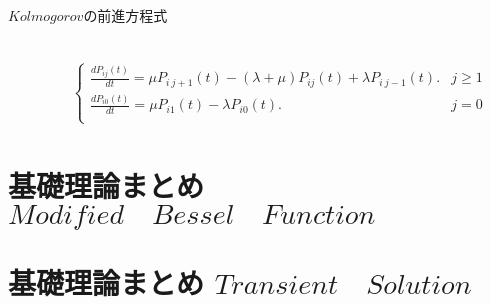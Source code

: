 \documentclass[a4j,papersize,disablejfam,slide,14pt]{jsarticle}
\begin{document}
    \begin{screen}
    	\begin{description}
        	\item[$Kolmogorov$の前進方程式]\mbox{}\\
            	\begin{eqnarray}
    				\begin{cases}
    					\frac{dP_{ij}(t)}{dt} = \mu P_{i\ j+1}(t) - (\lambda + \mu) P_{ij}(t) + \lambda P_{i\ j-1}(t). & \text{$j \geq 1$} \\
                        \frac{dP_{i0}(t)}{dt} = \mu P_{i 1}(t) - \lambda P_{i0}(t). & \text{$j = 0$} \\
        			\end{cases}
    			\end{eqnarray}
        \end{description}
    \end{screen}

\newpage
\section{基礎理論まとめ \qquad $Modified\quad Bessel\quad Function$}


\newpage
\section{基礎理論まとめ \qquad $Transient\quad Solution$}


\scriptsize
\newpage
\end{document}

